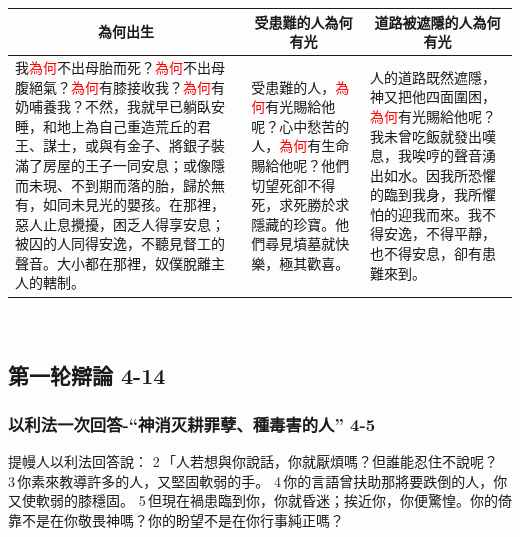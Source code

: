 \begin{table}[H]
\centering 
\begin{tabular}{p{23.92em}|p{9.6em}|p{}}    \toprule 
\multicolumn{1}{c|}{為何出生}&\multicolumn{1}{c|}{受患難的人為何有光}&\multicolumn{1}{c}{道路被遮隱的人為何有光}\\\midrule     
我\textcolor{red}{為何}不出母胎而死？\textcolor{red}{為何}不出母腹絕氣？\textcolor{red}{為何}有膝接收我？\textcolor{red}{為何}有奶哺養我？不然，我就早已躺臥安睡，和地上為自己重造荒丘的君王、謀士，或與有金子、將銀子裝滿了房屋的王子一同安息；或像隱而未現、不到期而落的胎，歸於無有，如同未見光的嬰孩。在那裡，惡人止息攪擾，困乏人得享安息；被囚的人同得安逸，不聽見督工的聲音。大小都在那裡，奴僕脫離主人的轄制。
&受患難的人，\textcolor{red}{為何}有光賜給他呢？心中愁苦的人，\textcolor{red}{為何}有生命賜給他呢？他們切望死卻不得死，求死勝於求隱藏的珍寶。他們尋見墳墓就快樂，極其歡喜。
&人的道路既然遮隱，神又把他四面圍困，\textcolor{red}{為何}有光賜給他呢？我未曾吃飯就發出嘆息，我唉哼的聲音湧出如水。因我所恐懼的臨到我身，我所懼怕的迎我而來。我不得安逸，不得平靜，也不得安息，卻有患難來到。\\\bottomrule
\end{tabular} 
\end{table}
 


\subsection{第一轮辯論 4-14}
\subsubsection{以利法一次回答-“神消灭耕罪孽、種毒害的人” 4-5}
提幔人以利法回答說： 2 「人若想與你說話，你就厭煩嗎？但誰能忍住不說呢？ 3 你素來教導許多的人，又堅固軟弱的手。 4 你的言語曾扶助那將要跌倒的人，你又使軟弱的膝穩固。 5 但現在禍患臨到你，你就昏迷；挨近你，你便驚惶。你的倚靠不是在你敬畏神嗎？你的盼望不是在你行事純正嗎？

